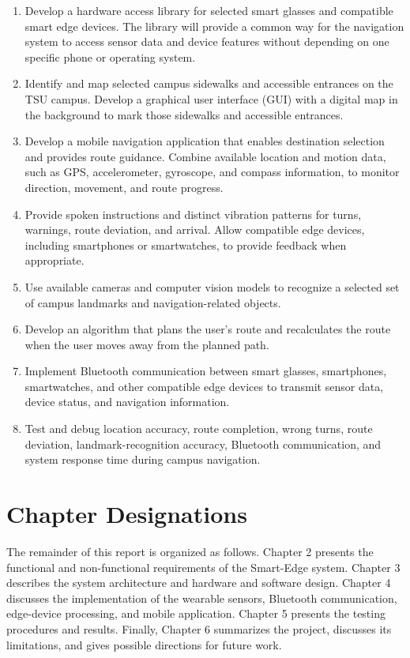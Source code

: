 \documentclass[12pt,letterpaper,oneside,reqno]{book}
\theoremstyle{plain}
\theoremstyle{definition}
\theoremstyle{plain}
\theoremstyle{remark}
\theoremstyle{plain}
\theoremstyle{definition}
\theoremstyle{plain}
\begin{document}
\begin{enumerate}
    \item Develop a hardware access library for selected smart glasses and compatible smart edge devices. The library will provide a common way for the navigation system to access sensor data and device features without depending on one specific phone or operating system.

    \item Identify and map selected campus sidewalks and accessible entrances on the TSU campus. Develop a graphical user interface (GUI) with a digital map in the background to mark those sidewalks and accessible entrances.

    \item Develop a mobile navigation application that enables destination selection and provides route guidance. Combine available location and motion data, such as GPS, accelerometer, gyroscope, and compass information, to monitor direction, movement, and route progress.

    \item Provide spoken instructions and distinct vibration patterns for turns, warnings, route deviation, and arrival. Allow compatible edge devices, including smartphones or smartwatches, to provide feedback when appropriate.

    \item Use available cameras and computer vision models to recognize a selected set of campus landmarks and navigation-related objects.

    \item Develop an algorithm that plans the user's route and recalculates the route when the user moves away from the planned path.

    \item Implement Bluetooth communication between smart glasses, smartphones, smartwatches, and other compatible edge devices to transmit sensor data, device status, and navigation information.

    \item Test and debug location accuracy, route completion, wrong turns, route deviation, landmark-recognition accuracy, Bluetooth communication, and system response time during campus navigation.
\end{enumerate}

\section{Chapter Designations}
The remainder of this report is organized as follows. Chapter 2 presents the functional and non-functional requirements of the Smart-Edge system. Chapter 3 describes the system architecture and hardware and software design. Chapter 4 discusses the implementation of the wearable sensors, Bluetooth communication, edge-device processing, and mobile application. Chapter 5 presents the testing procedures and results. Finally, Chapter 6 summarizes the project, discusses its limitations, and gives possible directions for future work.
\end{document}
